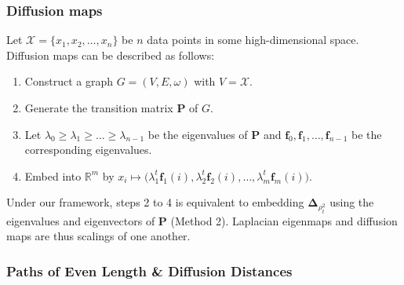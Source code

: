 \documentclass[professionalfonts, hyperref={pdfpagelabels=false,
  colorlinks=true, linkcolor=purple}]{beamer}
\begin{document}
\begin{frame}[label=diffusion_maps]
  \frametitle{Diffusion maps}
    Let $\mathcal{X} = \{x_1,x_2,\dots,x_n\}$ be $n$ data points in some
    high-dimensional space. Diffusion maps
    \cite{coifman06:_diffus_maps} can be described as follows:
    \vskip10pt
  \begin{enumerate}
  \item Construct a graph $G = (V,E,\omega)$ with $V =
    \mathcal{X}$.
  \item Generate the transition matrix $\bm{P}$ of $G$.
  \item Let $\lambda_0 \geq \lambda_1 \geq \dots
    \geq \lambda_{n-1}$ be the eigenvalues of $\mathbf{P}$ and $\bm{f}_0, \bm{f}_1,
    \dots, \bm{f}_{n-1}$ be the corresponding eigenvalues.
  \item Embed into $\mathbb{R}^{m}$ by $x_i \mapsto \bigl(
    \lambda_{1}^{t} \bm{f}_{1}(i), \lambda_{2}^{t} \bm{f}_{2}(i),
    \dots, \lambda_{m}^{t} \bm{f}_{m}(i))$.
  \end{enumerate}
  \begin{alertblock}{}
    Under our framework, steps 2 to 4 is equivalent to embedding
    $\bm{\Delta}_{\rho_{t}^2}$ using the eigenvalues and eigenvectors
    of $\mathbf{P}$ (Method 2). Laplacian eigenmaps and diffusion maps
    are thus \alert{scalings} of one another.
  \end{alertblock}
\end{frame}

\begin{frame}
\frametitle{Paths of Even Length  \& Diffusion Distances}
  \subfiglabelskip=0pt
  \begin{figure}[htbp]
    \label{fig:two-step}
    \centering
    \hspace{3pt}
  \end{figure}
\end{frame}
\end{document}
